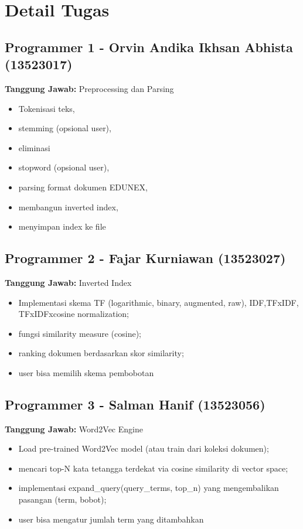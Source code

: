 \documentclass[12pt,a4paper]{report}
\begin{document}
\section{Detail Tugas}

\subsection{Programmer 1 - Orvin Andika Ikhsan Abhista (13523017)}
\textbf{Tanggung Jawab:} Preprocessing dan Parsing
\begin{itemize}
    \item Tokenisasi teks, 
    \item stemming (opsional user), 
    \item eliminasi
    \item stopword (opsional user), 
    \item parsing format dokumen EDUNEX,
    \item membangun inverted index, 
    \item menyimpan index ke file
\end{itemize}

\subsection{Programmer 2 - Fajar Kurniawan (13523027)}
\textbf{Tanggung Jawab:} Inverted Index
\begin{itemize}
    \item Implementasi skema TF (logarithmic, binary, augmented, raw), IDF,TFxIDF, TFxIDFxcosine normalization; 
    \item fungsi similarity measure (cosine); 
    \item ranking dokumen berdasarkan skor similarity; 
    \item user bisa memilih skema pembobotan
\end{itemize}

\subsection{Programmer 3 - Salman Hanif (13523056)}
\textbf{Tanggung Jawab:} Word2Vec Engine
\begin{itemize}
    \item Load pre-trained Word2Vec model (atau train dari koleksi dokumen); 
    \item mencari top-N kata tetangga terdekat via cosine similarity di vector space; 
    \item implementasi expand\_query(query\_terms, top\_n) yang mengembalikan pasangan (term, bobot); 
    \item user bisa mengatur jumlah term yang ditambahkan
\end{itemize}
\end{document}
